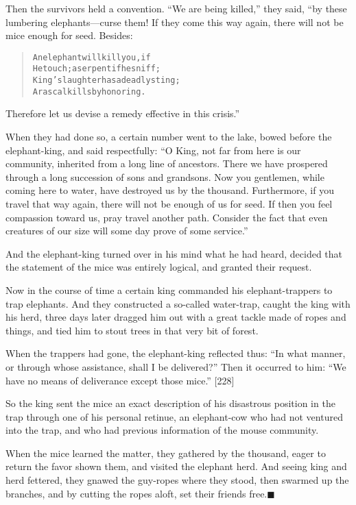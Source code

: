 \documentclass[article, twoside, 14pt]{memoir}
\newcommand{\qed}{\hfill \ensuremath{\blacksquare}}
\renewenvironment{verbatim}{%
\begin{quote}%
\vskip -10pt%
\begin{alltt}\normalfont\large}{\end{alltt}%
\end{quote}%
\vskip -10pt
} %
\begin{document}
Then the survivors held a convention. ``We are being killed,'' they
said, “by these lumbering elephants---curse them! If they come this
way again, there will not be mice enough for seed. Besides:

\begin{verbatim}
An elephant will kill you, if
He touch; a serpent if he sniff;
King's laughter has a deadly sting;
A rascal kills by honoring.
\end{verbatim}
Therefore let us devise a remedy effective in this crisis.”

When they had done so, a certain number went to the lake, bowed
before the elephant-king, and said respectfully:
``O King, not far from here is our community, inherited from a long line of ancestors. There we have prospered through a long succession of sons and grandsons. Now you gentlemen, while coming here to water, have destroyed us by the thousand. Furthermore, if you travel that way again, there will not be enough of us for seed. If then you feel compassion toward us, pray travel another path. Consider the fact that even creatures of our size will some day prove of some service.''

And the elephant-king turned over in his mind what he had heard,
decided that the statement of the mice was entirely logical, and
granted their request.

Now in the course of time a certain king commanded his
elephant-trappers to trap elephants. And they constructed a
so-called water-trap, caught the king with his herd, three days
later dragged him out with a great tackle made of ropes and things,
and tied him to stout trees in that very bit of forest.

When the trappers had gone, the elephant-king reflected thus:
``In what manner, or through whose assistance, shall I be delivered?''
Then it occurred to him:
``We have no means of deliverance except those mice.'' [228]

So the king sent the mice an exact description of his disastrous
position in the trap through one of his personal retinue, an
elephant-cow who had not ventured into the trap, and who had
previous information of the mouse community.

When the mice learned the matter, they gathered by the thousand,
eager to return the favor shown them, and visited the elephant
herd. And seeing king and herd fettered, they gnawed the guy-ropes
where they stood, then swarmed up the branches, and by cutting the
ropes aloft, set their friends free.\hyperref[s44]{\qed}
\end{document}
